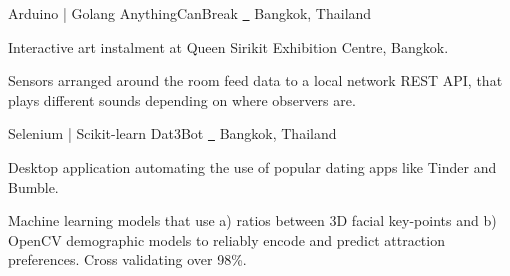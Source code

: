 
\begin{cventries}
 
  \cventry 
    { Arduino | Golang  } %
    { AnythingCanBreak\; \href{https://github.com/yohanderose/AnythingCanBreak}{\faGithub\ }	} %
	{Bangkok, Thailand} %
    {} %
    {
      \begin{cvitems} %
		  \item { Interactive art instalment at Queen Sirikit Exhibition Centre, Bangkok. }
		  \item { Sensors arranged around the room feed data to a local network REST API, that plays different sounds depending on where observers are. }
      \end{cvitems}
    }

  \cventry
    { Selenium | Scikit-learn } %
    {Dat3Bot\; \href{https://github.com/yohanderose/Dat3Bot}{\faGithub\ }	\href{https://yohanderose.dev/dating-with-python}\faBook} %
    {Bangkok, Thailand} %
    {} %
    {
      \begin{cvitems} %
      	\item { Desktop application automating the use of popular dating apps like Tinder and Bumble. }
      	\item { Machine learning models that use a) ratios between 3D facial key-points and b) OpenCV demographic models to reliably encode and predict attraction preferences. Cross validating over 98\%.}
      \end{cvitems}
    }




\end{cventries}
